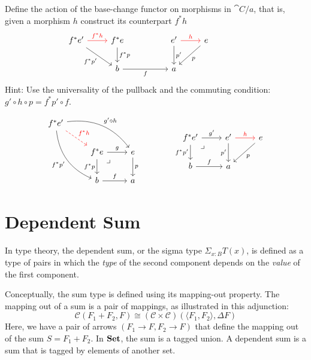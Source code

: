 \documentclass[DaoFP]{subfiles}
\begin{document}
\begin{exercise}
Define the action of the base-change functor on morphisms in $\cat C/a$, that is, given a morphism $h$ construct its counterpart $f^* h$
\[
 \begin{tikzcd}
f^* e'
 \arrow[dr, "f^*p'"']
 \arrow[r, red, "f^* h"]
 & f^* e
\arrow[d, "f^*p"]
&& e'
\arrow[d, "p'"]
\arrow[r, red, "h"]
& e
\arrow[dl, "p"]
 \\
& b
\arrow[rr, "f"']
 &&a
\end{tikzcd}
\hspace{40pt}
\begin{tikzcd}
\end{tikzcd}
\]
Hint: Use the universality of the pullback and the commuting condition: $g' \circ h \circ p = f^* p' \circ f$.

\[
\begin{tikzcd}
 f^* e'
 \arrow[dr, dashed, red, "f^* h"]
 \arrow[drr, bend left, "g' \circ h"]
 \arrow[ddr, bend right, "f^* p'"']
 \\
 &f^* e
 \arrow[r, "g"]
 \arrow[d, "f^* p"']
\arrow[dr, phantom,  , very near start, "\lrcorner"]
 &e
 \arrow[d, "p"]
 \\
 &b
 \arrow[r, "f"]
 &a
\end{tikzcd}
\hspace{40pt}
\begin{tikzcd}
f^* e'
\arrow[r, "g'"]
\arrow[d, "f^* p'"']
\arrow[dr, phantom,  , very near start, "\lrcorner"]
& e'
\arrow[d, "p'"']
\arrow[r, red, "h"]
& e
\arrow[dl, "p"]
\\
b
\arrow[r, "f"]
& a
\end{tikzcd}
\]


\end{exercise}

\section{Dependent Sum}

In type theory, the dependent sum, or the sigma type $\Sigma_{x : B} T(x)$, is defined as a type of pairs in which the \emph{type} of the second component depends on the \emph{value} of the first component. 

Conceptually, the sum type is defined using its mapping-out property. The mapping out of a sum is a pair of mappings, as illustrated in this adjunction:
\[ \mathcal{C}(F_1 + F_2, F) \cong (\mathcal{C} \times \mathcal{C}) (\langle F_1, F_2 \rangle, \Delta F) \]
Here, we have a pair of arrows $(F_1 \to F, F_2 \to F)$ that define the mapping out of the sum $S = F_1 + F_2$. In $\mathbf{Set}$, the sum is a tagged union. A dependent sum is a sum that is tagged by elements of another set.
\end{document}
